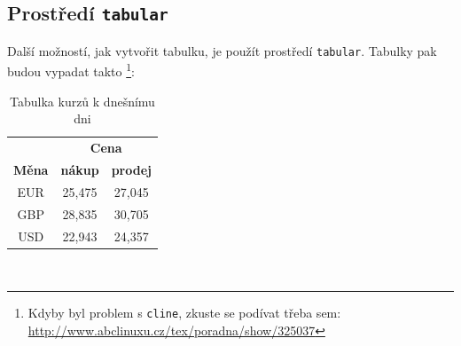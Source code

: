 \documentclass[11pt, a4paper]{article}
\begin{document}
\subsection{Prostředí \texttt{tabular}}
Další možností, jak vytvořit tabulku, je použít prostředí \texttt{tabular}. Tabulky pak 
budou vypadat takto \footnote{Kdyby byl problem s \texttt{cline}, zkuste se podívat třeba sem: \url{http://www.abclinuxu.cz/tex/poradna/show/325037}}:
\vspace{1em}
\begin{table}[h]
    \centering
    \begin{tabular}{|c|c|c|}
        \hline
         & \multicolumn{2}{|c|}{\textbf{Cena}} \\ \cline{2-3}
        \textbf{Měna} & \textbf{nákup} & \textbf{prodej} \\ \hline
         EUR & 25,475 & 27,045 \\ 
         GBP & 28,835 & 30,705 \\
         USD & 22,943 & 24,357 \\ \hline
    \end{tabular}\\
    \caption{Tabulka kurzů k dnešnímu dni}\label{tab-meny}
\end{table}
\vspace{1em}
\end{document}

